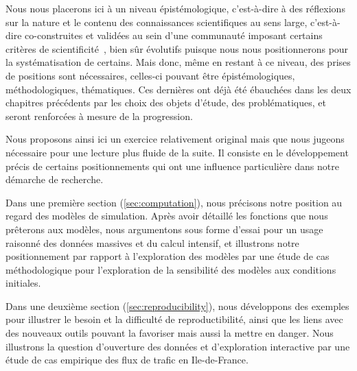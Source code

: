    
Nous nous placerons ici à un niveau épistémologique, c'est-à-dire à des réflexions sur la nature et le contenu des connaissances scientifiques au sens large, c'est-à-dire co-construites et validées au sein d'une communauté imposant certains critères de scientificité~\cite{morin1991methode}, bien sûr évolutifs puisque nous nous positionnerons pour la systématisation de certains. Mais donc, même en restant à ce niveau, des prises de positions sont nécessaires, celles-ci pouvant être épistémologiques, méthodologiques, thématiques. Ces dernières ont déjà été ébauchées dans les deux chapitres précédents par les choix des objets d'étude, des problématiques, et seront renforcées à mesure de la progression.
 
 
Nous proposons ainsi ici un exercice relativement original mais que nous jugeons nécessaire pour une lecture plus fluide de la suite. Il consiste en le développement précis de certains positionnements qui ont une influence particulière dans notre démarche de recherche.

Dans une première section (\ref{sec:computation}), nous précisons notre position au regard des modèles de simulation. Après avoir détaillé les fonctions que nous prêterons aux modèles, nous argumentons sous forme d'essai pour un usage raisonné des données massives et du calcul intensif, et illustrons notre positionnement par rapport à l'exploration des modèles par une étude de cas méthodologique pour l'exploration de la sensibilité des modèles aux conditions initiales.

Dans une deuxième section (\ref{sec:reproducibility}), nous développons des exemples pour illustrer le besoin et la difficulté de reproductibilité, ainsi que les liens avec des nouveaux outils pouvant la favoriser mais aussi la mettre en danger. Nous illustrons la question d'ouverture des données et d'exploration interactive par une étude de cas empirique des flux de trafic en Ile-de-France.

